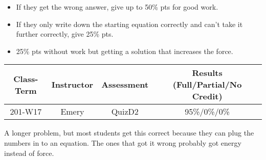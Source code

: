 \begin{rubric}

\begin{itemize}
	\item If they get the wrong answer, give up to 50\% pts for good work.
	\item If they only write down the starting equation correctly and can't take it further correctly, give 25\% pts.
	\item 25\% pts without work but getting a solution that increases the force.
\end{itemize}

\end{rubric}

\begin{outcomes}
	\begin{center}
		\begin{tabular}{cccc}
			\hline\hline
                Class-Term & Instructor & Assessment & Results (Full/Partial/No Credit) \\
			\hline
                201-W17 & Emery & QuizD2 & 95\%/0\%/0\%\\
			\hline
		\end{tabular}
	\end{center}
\end{outcomes}

\begin{comments}

A longer problem, but most students get this correct because they can plug the numbers in to an equation. The ones that got it wrong probably got energy instead of force.
	
\end{comments}
